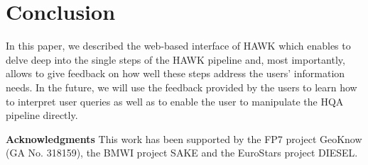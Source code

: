 \documentclass{llncs}
\begin{document}

\section{Conclusion}
\label{sec:conclusion}
In this paper, we described the web-based interface of HAWK which enables to delve deep into the single steps of the HAWK pipeline and, most importantly, allows to give feedback on how well these steps address the users' information needs. 
In the future, we will use the feedback provided by the users to learn how to interpret user queries  as well as to enable the user to manipulate the HQA pipeline directly. 

\textbf{Acknowledgments}
This work has been supported by the FP7 project GeoKnow (GA No. 318159), the BMWI project SAKE and the EuroStars project DIESEL.



\end{document}
